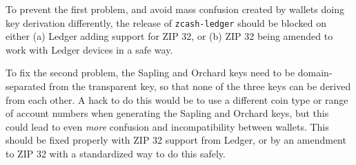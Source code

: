\documentclass[10pt,titlepage]{article}
\begin{document}
To prevent the first problem, and avoid mass confusion created by wallets doing
key derivation differently, the release of \texttt{zcash-ledger} should be
blocked on either (a) Ledger adding support for ZIP 32, or (b) ZIP 32 being
amended to work with Ledger devices in a safe way.

To fix the second problem, the Sapling and Orchard keys need to be
domain-separated from the transparent key, so that none of the three keys can be
derived from each other. A hack to do this would be to use a different coin type
or range of account numbers when generating the Sapling and Orchard keys, but
this could lead to even \emph{more} confusion and incompatibility between
wallets. This should be fixed properly with ZIP 32 support from Ledger, or by an
amendment to ZIP 32 with a standardized way to do this safely.
\end{document}
